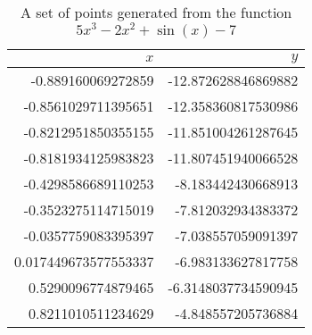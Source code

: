 \begin{table}[ht!]
  \centering
  \begin{tabular}{|r|r|}
    \hline
    $x$ & $y$	\\
    \hline
    \hline
    -0.889160069272859 & -12.872628846869882	\\
    \hline
    -0.8561029711395651 & -12.358360817530986	\\
    \hline
    -0.8212951850355155 & -11.851004261287645	\\
    \hline
    -0.8181934125983823 & -11.807451940066528	\\
    \hline
    -0.4298586689110253 & -8.183442430668913	\\
    \hline
    -0.3523275114715019 & -7.812032934383372	\\
    \hline
    -0.0357759083395397 & -7.038557059091397	\\
    \hline
    0.017449673577553337 & -6.983133627817758	\\
    \hline
    0.5290096774879465 & -6.3148037734590945	\\
    \hline
    0.8211010511234629 & -4.848557205736884	\\
    \hline
  \end{tabular}
  \caption{A set of points generated from the function $5x^3 - 2x^2 + \sin(x) - 7$}
  \label{tab:bg:gp:repr_ev:points}
\end{table}
